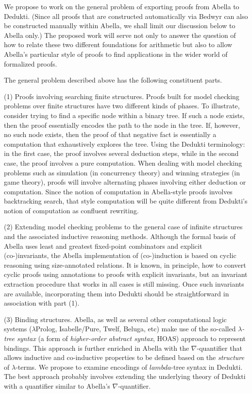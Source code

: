 We propose to work on the general problem of exporting proofs from
Abella to Dedukti.  (Since all proofs that are constructed
automatically via Bedwyr can also be constructed manually within
Abella, we shall limit our discussion below to Abella only.)  The
proposed work will serve not only to answer the question of how to
relate these two different foundations for arithmetic but also to
allow Abella's particular style of proofs to find applications in the
wider world of formalized proofs.

The general problem described above has the following constituent parts.

(1) Proofs involving searching finite structures. Proofs built for
model checking problems over finite structures have two different
kinds of phases.  To illustrate, consider trying to find a specific
node within a binary tree.  If such a node exists, then the proof
essentially encodes the path to the node in the tree.  If, however, no
such node exists, then the proof of that negative fact is essentially
a computation that exhaustively explores the tree.  Using the Dedukti
terminology: in the first case, the proof involves several deduction
steps, while in the second case, the proof involves a pure
computation. When dealing with model checking problems such as
simulation (in concurrency theory) and winning strategies (in game
theory), proofs will involve alternating phases involving either
deduction or computation.  Since the notion of computation in
Abella-style proofs involves backtracking search, that style
computation will be quite different from Dedukti's notion of
computation as confluent rewriting.

(2) Extending model checking problems to the general case of infinite
structures and the associated inductive reasoning methods. Although
the formal basis of Abella uses least and greatest fixed-point
combinators and explicit (co-)invariants, the Abella implementation of
(co-)induction is based on cyclic reasoning using size-annotated
relations. It is known, in principle, how to convert cyclic proofs
using annotations to proofs with explicit invariants, but an invariant
extraction procedure that works in all cases is still missing. Once
such invariants are available, incorporating them into Dedukti should
be straightforward in association with part (1).

(3) Binding structures. Abella, as well as several other computational
logic systems ($\lambda$Prolog, Isabelle/Pure, Twelf, Beluga, etc)
make use of the so-called \emph{$\lambda$-tree syntax} (a form of
\emph{higher-order abstract syntax}, HOAS) approach to represent
bindings. This approach is further enriched in Abella with the
$\nabla$-quantifier that allows inductive and co-inductive properties
to be defined based on the \emph{structure} of $\lambda$-terms. We
propose to examine encodings of $lambda$-tree syntax in Dedukti. The
best approach probably involves extending the underlying theory of
Dedukti with a quantifier similar to Abella's $\nabla$-quantifier.

